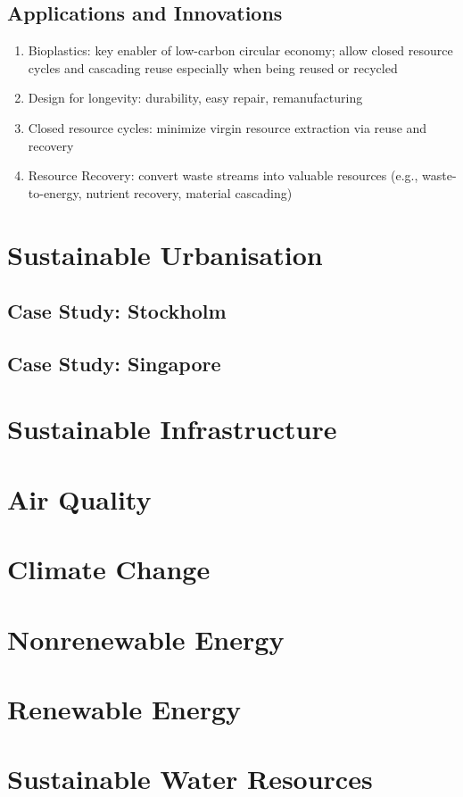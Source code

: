 \documentclass[12pt, a4paper]{article}
\begin{document}
\begin{multicols*}{3}
\begin{enumerate}[\roman*.]
\end{enumerate}

\subsection{Applications and Innovations}
\begin{enumerate}[\roman*.]
  \item Bioplastics: key enabler of low-carbon circular economy; allow closed resource cycles and cascading reuse especially when being reused or recycled
  \item Design for longevity: durability, easy repair, remanufacturing
  \item Closed resource cycles: minimize virgin resource extraction via reuse and recovery
  \item Resource Recovery: convert waste streams into valuable resources (e.g., waste-to-energy, nutrient recovery, material cascading)
\end{enumerate}
\colbreak
\section{Sustainable Urbanisation}
\subsection{Case Study: Stockholm}
\subsection{Case Study: Singapore}
\colbreak
\section{Sustainable Infrastructure}
\section{Air Quality}
\section{Climate Change}
\section{Nonrenewable Energy}
\section{Renewable Energy}
\section{Sustainable Water Resources}

\end{multicols*}
\end{document}
